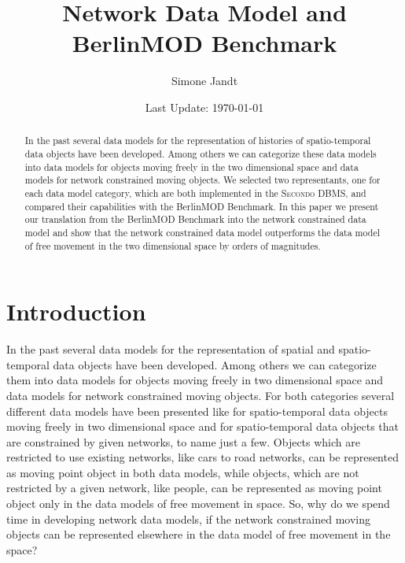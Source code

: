\documentclass[a4paper]{article}
\title{Network Data Model and BerlinMOD Benchmark}
\author{Simone Jandt}
\date{Last Update: \today}
\newcommand{\secondo}{\textsc{Secondo}}
\newcommand{\bmodb} {BerlinMOD Benchmark}
\begin{document}
\maketitle
\begin{abstract}
In the past several data models for the representation of histories of  spatio-temporal data
objects have been developed. Among others we can categorize these data models
into data models for objects moving freely in the two dimensional space and data
models for network constrained moving objects. We selected two representants,
one for each data model category, which are both implemented in the \secondo{} DBMS,
and compared their capabilities with the \bmodb{}. In this paper we present our
translation from the \bmodb{} into the network constrained data model and show
that the network constrained data model outperforms the data model of free movement
in the two dimensional space by orders of magnitudes.

\end{abstract}
\section{Introduction}
In the past several data models for the representation of spatial and
spatio-temporal data objects have been developed. Among others we can categorize
them into data models for objects moving freely in two dimensional space and
data models for network constrained moving objects. For both categories
several different data models have been presented like
\cite{335426,chenzaniolosqlst} for spatio-temporal data objects moving freely in
two dimensional space and \cite{1146465,956692,VazWolfNetMod} for
spatio-temporal data objects that are constrained by given networks,
to name just a few. Objects which are restricted to use existing networks, like
cars to road networks, can be represented as moving point object in both data
models, while objects, which are not restricted by a given network, like people,
can be represented as moving point object only in the data models of free movement
in space. So, why do we spend time in developing network data models, if the network
constrained moving objects can be represented elsewhere in the data model of free
movement in the space?
\end{document}

